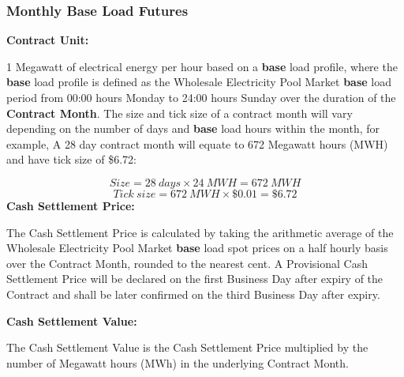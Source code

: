 \documentclass[12pt]{article}
\begin{document}
\subsubsection{Monthly Base Load Futures}
\begin{flushleft}
\textbf{Contract Unit:}\par
1 Megawatt of electrical energy per hour based on a \textbf{base} load profile, where the \textbf{base} load profile is defined as the Wholesale Electricity Pool Market \textbf{base} load period from 00:00 hours Monday to 24:00 hours Sunday over the duration of the \textbf{Contract Month}. The size and tick size of a contract month will vary depending on the number of days and \textbf{base} load hours within the month, for example, 
A 28 day contract month will equate to 672 Megawatt hours (MWH) and have tick size of \$6.72:\par
   $$ Size = 28 \ days \times 24 \ MWH = 672 \ MWH $$
   $$ Tick\ size = 672 \ MWH \times \$0.01 = \$6.72 $$
\frameboxend
\textbf{Cash Settlement Price:}\par
The Cash Settlement Price is calculated by taking the arithmetic
average of the Wholesale Electricity Pool Market \textbf{base} load spot prices on a half hourly basis over the Contract Month, rounded
to the nearest cent. A Provisional Cash Settlement Price will be
declared on the first Business Day after expiry of the Contract and shall be later confirmed on the third Business Day after expiry.\par
\textbf{Cash Settlement Value:}\par
The Cash Settlement Value is the Cash Settlement Price multiplied by the number of Megawatt hours (MWh) in the underlying Contract
Month.
\end{flushleft}
\end{document}
